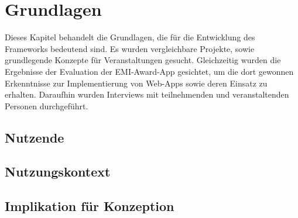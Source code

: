 \chapter{Grundlagen}








Dieses Kapitel behandelt die Grundlagen, die für die Entwicklung des Frameworks
bedeutend sind. Es wurden vergleichbare Projekte, sowie grundlegende Konzepte
für Veranstaltungen gesucht. Gleichzeitig wurden die Ergebnisse der Evaluation
der EMI-Award-App gesichtet, um die dort gewonnen Erkenntnisse zur
Implementierung von Web-Apps sowie deren Einsatz zu erhalten. Daraufhin wurden
Interviews mit teilnehmenden und veranstaltenden Personen durchgeführt.


\section{Nutzende}

\section{Nutzungskontext}

\section{Implikation für Konzeption}